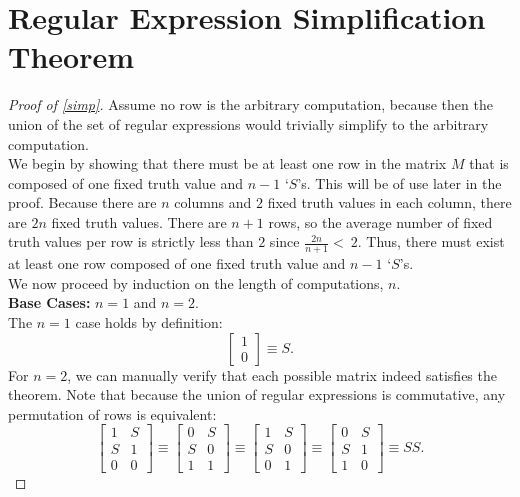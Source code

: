 \documentclass[runningheads]{llncs}
\begin{document}
\section{Regular Expression Simplification Theorem} \label{simp appendix}
\begin{proof}[Proof of \ref{simp}]
Assume no row is the arbitrary computation, because then the union of the set of regular expressions would trivially simplify to the arbitrary computation.\\

We begin by showing that there must be at least one row in the matrix $M$ that is composed of one fixed truth value and $n-1$ `$S$'s. This will be of use later in the proof. Because there are $n$ columns and $2$ fixed truth values in each column, there are $2n$ fixed truth values. There are $n+1$ rows, so the average number of fixed truth values per row is strictly less than $2$ since $\frac{2n}{n+1} < \ 2$.
Thus, there must exist at least one row composed of one fixed truth value and $n-1$ `$S$'s. \\

\noindent We now proceed by induction on the length of computations, $n$. \\
\textbf{Base Cases:} $n=1$ and $n=2$. \\
The $n=1$ case holds by definition:
    $$\begin{bmatrix}
    1\\
    0
    \end{bmatrix}  \equiv S.$$
For $n=2$, we can manually verify that each possible matrix indeed satisfies the theorem. Note that because the union of regular expressions is commutative, any permutation of rows is equivalent:
        $$\begin{bmatrix}
    1 & S\\
    S & 1\\
    0 & 0
    \end{bmatrix}  \equiv \begin{bmatrix}
    0 & S\\
    S & 0\\
    1 & 1
    \end{bmatrix} \equiv \begin{bmatrix}
    1 & S\\
    S & 0\\
    0 & 1
    \end{bmatrix} \equiv \begin{bmatrix}
    0 & S\\
    S & 1\\
    1 & 0
    \end{bmatrix} \equiv SS.
        $$


\end{proof}
\end{document}
